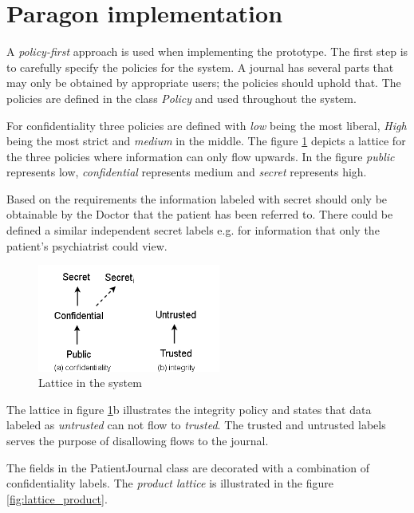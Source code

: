 \section{Paragon implementation}

A \emph{policy-first} approach is used when implementing the prototype. The first step is to carefully specify the policies for the system. A journal has several parts that may only be obtained by appropriate users; the policies should uphold that. The policies are defined in the class \emph{Policy} and used throughout the system.

For confidentiality three policies are defined with \emph{low} being the most liberal, \emph{High} being the most strict and \emph{medium} in the middle. The figure \ref{fig:lattice_confidentiality} depicts a lattice for the three policies where information can only flow upwards. In the figure \emph{public} represents low, \emph{confidential} represents medium and \emph{secret} represents high. 

Based on the requirements the information labeled with secret should only be obtainable by the Doctor that the patient has been referred to. There could be defined a similar independent secret labels e.g. for information that only the patient's psychiatrist could view.  


\begin{figure}[H] 
	\centering
	\includegraphics[width=6cm]{figures/lattice_confidentiality.png}
	\caption{Lattice in the system}
	\label{fig:lattice_confidentiality}
\end{figure}

The lattice in figure \ref{fig:lattice_confidentiality}b illustrates the integrity policy and states that data labeled as \emph{untrusted} can not flow to \emph{trusted}. The trusted and untrusted labels serves the purpose of disallowing flows to the journal.

The fields in the PatientJournal class are decorated with a combination of confidentiality labels. The \emph{product lattice} is illustrated in the figure \ref{fig:lattice_product}.

